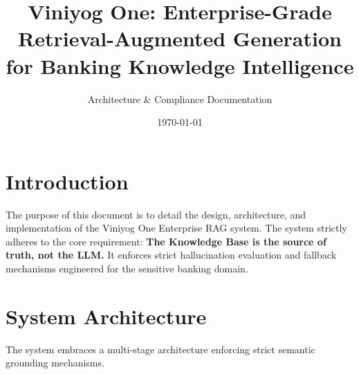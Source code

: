 \documentclass[11pt,a4paper]{article}
\title{\textbf{Viniyog One: Enterprise-Grade Retrieval-Augmented Generation for Banking Knowledge Intelligence}}
\author{Architecture \& Compliance Documentation}
\date{\today}
\begin{document}
\maketitle

\tableofcontents
\newpage

\section{Introduction}
The purpose of this document is to detail the design, architecture, and implementation of the Viniyog One Enterprise RAG system. The system strictly adheres to the core requirement: \textbf{The Knowledge Base is the source of truth, not the LLM.} It enforces strict hallucination evaluation and fallback mechanisms engineered for the sensitive banking domain.

\section{System Architecture}

The system embraces a multi-stage architecture enforcing strict semantic grounding mechanisms. 
\end{document}
